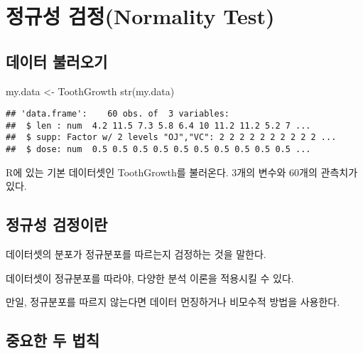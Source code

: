 \documentclass[
]{article}
\author{}
\date{\vspace{-2.5em}}
\newenvironment{Shaded}{\begin{snugshade}}{\end{snugshade}}
\newcommand{\FunctionTok}[1]{\textcolor[rgb]{0.00,0.00,0.00}{#1}}
\newcommand{\NormalTok}[1]{#1}
\newcommand{\OtherTok}[1]{\textcolor[rgb]{0.56,0.35,0.01}{#1}}
\begin{document}
{
\setcounter{tocdepth}{2}
\tableofcontents
}
\hypertarget{uxc815uxaddcuxc131-uxac80uxc815normality-test}{%
\section{정규성 검정(Normality Test)}\label{uxc815uxaddcuxc131-uxac80uxc815normality-test}}

\hypertarget{uxb370uxc774uxd130-uxbd88uxb7ecuxc624uxae30}{%
\subsection{데이터 불러오기}\label{uxb370uxc774uxd130-uxbd88uxb7ecuxc624uxae30}}

\begin{Shaded}
\begin{Highlighting}[]
\NormalTok{my.data }\OtherTok{\textless{}{-}}\NormalTok{ ToothGrowth}
\FunctionTok{str}\NormalTok{(my.data)}
\end{Highlighting}
\end{Shaded}

\begin{verbatim}
## 'data.frame':    60 obs. of  3 variables:
##  $ len : num  4.2 11.5 7.3 5.8 6.4 10 11.2 11.2 5.2 7 ...
##  $ supp: Factor w/ 2 levels "OJ","VC": 2 2 2 2 2 2 2 2 2 2 ...
##  $ dose: num  0.5 0.5 0.5 0.5 0.5 0.5 0.5 0.5 0.5 0.5 ...
\end{verbatim}

R에 있는 기본 데이터셋인 ToothGrowth를 불러온다.
3개의 변수와 60개의 관측치가 있다.

\hypertarget{uxc815uxaddcuxc131-uxac80uxc815uxc774uxb780}{%
\subsection{정규성 검정이란}\label{uxc815uxaddcuxc131-uxac80uxc815uxc774uxb780}}

데이터셋의 분포가 정규분포를 따르는지 검정하는 것을 말한다.

데이터셋이 정규분포를 따라야, 다양한 분석 이론을 적용시킬 수 있다.

만일, 정규분포를 따르지 않는다면 데이터 먼징하거나 비모수적 방법을 사용한다.

\hypertarget{uxc911uxc694uxd55c-uxb450-uxbc95uxce59}{%
\subsection{중요한 두 법칙}\label{uxc911uxc694uxd55c-uxb450-uxbc95uxce59}}
\end{document}
